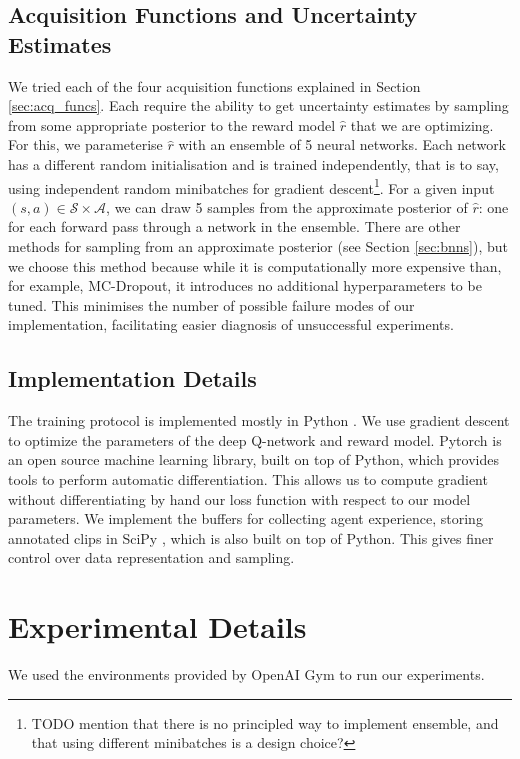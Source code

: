 \documentclass[11pt, a4paper, bibliography=totoc]{report}
\newcommand{\rp}{\hat{r}}
\begin{document}
\section{Acquisition Functions and Uncertainty Estimates}
We tried each of the four acquisition functions explained in Section \ref{sec:acq_funcs}. Each require the ability to get uncertainty estimates by sampling from some appropriate posterior to the reward model $ \rp $ that we are optimizing. For this, we parameterise $ \rp $ with an ensemble of 5 neural networks. Each network has a different random initialisation and is trained independently, that is to say, using independent random minibatches for gradient descent\footnote{TODO mention that there is no principled way to implement ensemble, and that using different minibatches is a design choice?}. For a given input $ (s,a) \in \mathcal{S} \times \mathcal{A} $, we can draw 5 samples from the approximate posterior of $ \rp $: one for each forward pass through a network in the ensemble. There are other methods for sampling from an approximate posterior (see Section \ref{sec:bnns}), but we choose this method because while it is computationally more expensive than, for example, MC-Dropout, it introduces no additional hyperparameters to be tuned. This minimises the number of possible failure modes of our implementation, facilitating easier diagnosis of unsuccessful experiments.

\section{Implementation Details}
The training protocol is implemented mostly in Python \cite{van1995python}. We use gradient descent to optimize the parameters of the deep Q-network and reward model. Pytorch \cite{paszke2017automatic} is an open source machine learning library, built on top of Python, which provides tools to perform automatic differentiation. This allows us to compute gradient without differentiating by hand our loss function with respect to our model parameters. We implement the buffers for collecting agent experience, storing annotated clips in SciPy \cite{jones2001}, which is also built on top of Python. This gives finer control over data representation and sampling.

\chapter{Experimental Details}
We used the environments provided by OpenAI Gym to run our experiments.
\end{document}
